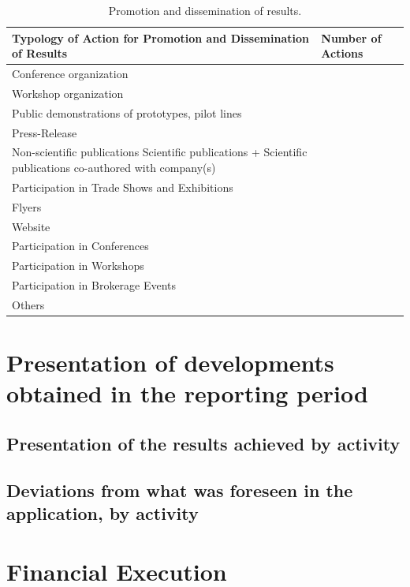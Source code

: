 \documentclass{ani-intermediate}
\begin{document}
\begin{table}[!htp]
  \begin{tabular}{|p{}|p{}|}
    \hline
    \textbf{Typology of Action for Promotion and Dissemination of Results} & \textbf{Number of Actions} \\ \hline
    Conference organization                                          &  \\ \hline
    Workshop organization                                            &  \\ \hline
    Public demonstrations of prototypes, pilot lines                 &  \\ \hline
    Press-Release                                                    &  \\ \hline
    Non-scientific publications Scientific publications + Scientific publications co-authored with company(s) &  \\ \hline
    Participation in Trade Shows and Exhibitions                     &  \\ \hline
    Flyers                                                           &  \\ \hline
    Website                                                          &  \\ \hline
    Participation in Conferences                                     &  \\ \hline
    Participation in Workshops                                       &  \\ \hline
    Participation in Brokerage Events                                &  \\ \hline
    Others                                                           &  \\ \hline
  \end{tabular}
  \caption{Promotion and dissemination of results.}
\end{table}


\chapter{Presentation of developments obtained in the reporting period}

\section{Presentation of the results achieved by activity}
\cite{sigfridsson}\lipsum[25-30]

\section{Deviations from what was foreseen in the application, by activity}
\lipsum[30-32]

\chapter{Financial Execution}
\lipsum[33-35]



\nocite{*}


\end{document}
